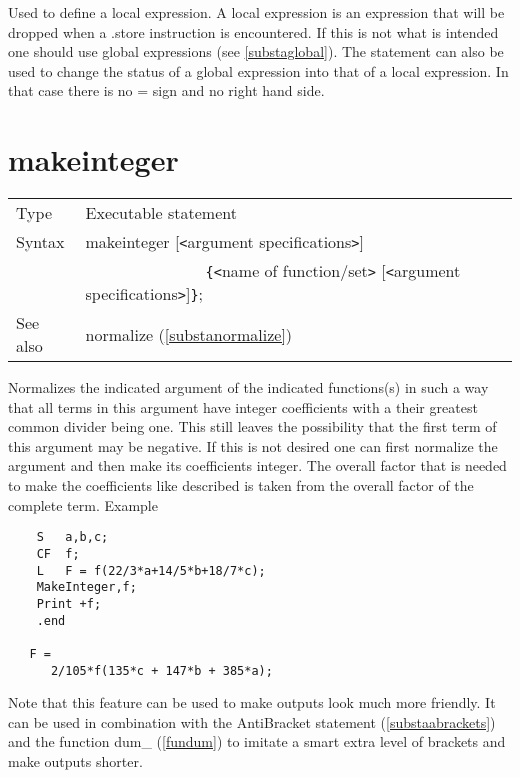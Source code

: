 \noindent Used to define a local expression. A local 
expression is an expression that will be dropped when a 
.store instruction is encountered. If this is not what is 
intended one should use global expressions (see 
\ref{substaglobal}). The statement can also be used to change the status of 
a global expression into that of a local expression. In that case there is 
no = sign and no right hand side. \vspace{10mm}


\section{makeinteger}
\label{substamakeinteger}

\noindent \begin{tabular}{ll}
Type & Executable statement\\
Syntax & makeinteger [{\tt<}argument specifications{\tt>}] \\ &
    \ \ \ \ \ \ \ \ \ \ \ \ \ \ \ 
 \verb:{:{\tt<}name of function/set{\tt>}
[{\tt<}argument specifications{\tt>}]\verb:}:; \\
See also & normalize (\ref{substanormalize})
\end{tabular} \vspace{4mm}

\noindent Normalizes the indicated 
argument of the indicated functions(s) in such a way that 
all terms in this argument have integer 
coefficients with a their greatest common 
divider being one. This still leaves the possibility that the first term of 
this argument may be negative. If this is not desired one can first 
normalize\index{normalize} the argument and then make its coefficients 
integer. The overall factor that is needed to make the coefficients like 
described is taken from the overall factor of the complete term. Example
\begin{verbatim}
    S   a,b,c;
    CF  f;
    L   F = f(22/3*a+14/5*b+18/7*c);
    MakeInteger,f;
    Print +f;
    .end

   F =
      2/105*f(135*c + 147*b + 385*a);

\end{verbatim}

\noindent Note that this feature can be used to make outputs look much more 
friendly. It can be used in combination with the 
AntiBracket statement (\ref{substaabrackets}) and the 
function dum\_\index{dum\_} (\ref{fundum}) to imitate a smart extra level 
of brackets and make outputs shorter.
\vspace{10mm}

